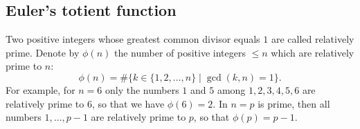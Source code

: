 \subsection{Euler's totient function}
Two positive integers whose greatest common divisor equals $1$ are called relatively prime.
Denote by $\phi(n)$ the number of positive integers $\le n$ which are relatively prime to $n$:
\[
\phi(n) = \#\{k \in \{1, 2, \ldots, n\} \mid \gcd(k,n) = 1\}.
\]
For example, for $n = 6$ only the numbers $1$ and $5$ among $1, 2, 3, 4, 5, 6$ are relatively prime to $6$,
so that we have $\phi(6) = 2$.
In $n=p$ is prime, then all numbers $1, \ldots, p-1$ are relatively prime to $p$, so that $\phi(p) = p-1$.
